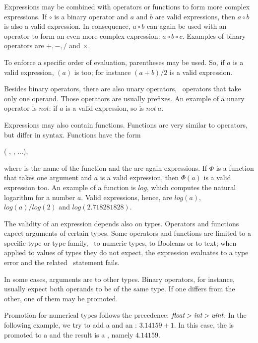 Expressions may be combined
with operators or functions
to form more complex expressions.
If $\circ$ is a binary operator
and $a$ and $b$ are valid expressions,
then
$a \circ b$
is also a valid expression.
In consequence, $a \circ b$ can
again be used with an operator
to form an even more complex
expression:
$a \circ b \circ c$.
Examples of binary operators are
$+, -, /$ and $\times$.

To enforce a specific order of
evaluation, parentheses may be used.
So, if $a$ is a valid expression,
$(a)$ is too; for instance
$(a+b)/2$
is a valid expression.

Besides binary operators, there are also
unary operators, \ie\ operators that
take only one operand. Those operators
are usually prefixes. An example of
a unary operator is $not$:
if $a$ is a valid expression,
so is $not~a$.

Expressions may also contain
functions. Functions are very
similar to operators, but differ
in syntax. Functions have the
form

(
,
,
$\dots$),

where  is the name
of the function and the 
are again expressions.
If $\Phi$ is a function
that takes one argument and
$a$ is a valid expression,
then $\Phi(a)$ is a valid expression too.
An example of a function is $log$,
which computes the natural logarithm
for a number $a$. Valid expressions,
hence, are $log(a)$, $log(a)/log(2)$ and
$log(2.718281828)$.

The validity of an expression depends
also on types. Operators and functions
expect arguments of certain types.
Some operators and functions are limited
to a specific type or type family,
\eg\ to numeric types,
to Booleans or to text; when applied
to values of types they do not expect,
the expression evaluates to a type error
and the related \sql\ statement fails.

In some cases, arguments are 
to other types. Binary operators, for instance,
usually expect both operands to be of the same type.
If one differs from the other, one of them
may be promoted.

Promotion for numerical types follows 
the precedence:
$\textit{float} > \textit{int} > \textit{uint}$.
In the following example, we try to
add a  and an :
$3.14159 + 1$. In this case, the 
is promoted to a  and the
result is a ,
namely $4.14159$.

